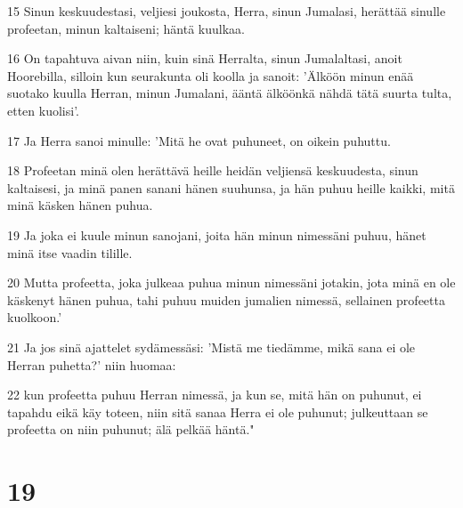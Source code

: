 \par 15 Sinun keskuudestasi, veljiesi joukosta, Herra, sinun Jumalasi, herättää sinulle profeetan, minun kaltaiseni; häntä kuulkaa.
\par 16 On tapahtuva aivan niin, kuin sinä Herralta, sinun Jumalaltasi, anoit Hoorebilla, silloin kun seurakunta oli koolla ja sanoit: 'Älköön minun enää suotako kuulla Herran, minun Jumalani, ääntä älköönkä nähdä tätä suurta tulta, etten kuolisi'.
\par 17 Ja Herra sanoi minulle: 'Mitä he ovat puhuneet, on oikein puhuttu.
\par 18 Profeetan minä olen herättävä heille heidän veljiensä keskuudesta, sinun kaltaisesi, ja minä panen sanani hänen suuhunsa, ja hän puhuu heille kaikki, mitä minä käsken hänen puhua.
\par 19 Ja joka ei kuule minun sanojani, joita hän minun nimessäni puhuu, hänet minä itse vaadin tilille.
\par 20 Mutta profeetta, joka julkeaa puhua minun nimessäni jotakin, jota minä en ole käskenyt hänen puhua, tahi puhuu muiden jumalien nimessä, sellainen profeetta kuolkoon.'
\par 21 Ja jos sinä ajattelet sydämessäsi: 'Mistä me tiedämme, mikä sana ei ole Herran puhetta?' niin huomaa:
\par 22 kun profeetta puhuu Herran nimessä, ja kun se, mitä hän on puhunut, ei tapahdu eikä käy toteen, niin sitä sanaa Herra ei ole puhunut; julkeuttaan se profeetta on niin puhunut; älä pelkää häntä."

\chapter{19}

